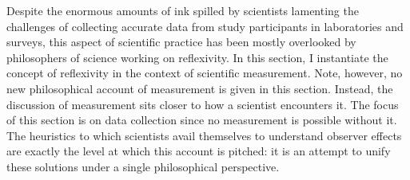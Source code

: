 
Despite the enormous amounts of ink spilled by scientists lamenting the challenges of collecting accurate data from study participants in laboratories and surveys, this aspect of scientific practice has been mostly overlooked by philosophers of science working on reflexivity. In this section, I instantiate the concept of reflexivity in the context of scientific measurement. Note, however, no new philosophical account of measurement is given in this section. Instead, the discussion of measurement sits closer to how a scientist encounters it. The focus of this section is on data collection since no measurement is possible without it. The heuristics to which scientists avail themselves to understand observer effects are exactly the level at which this account is pitched: it is an attempt to unify these solutions under a single philosophical perspective.


